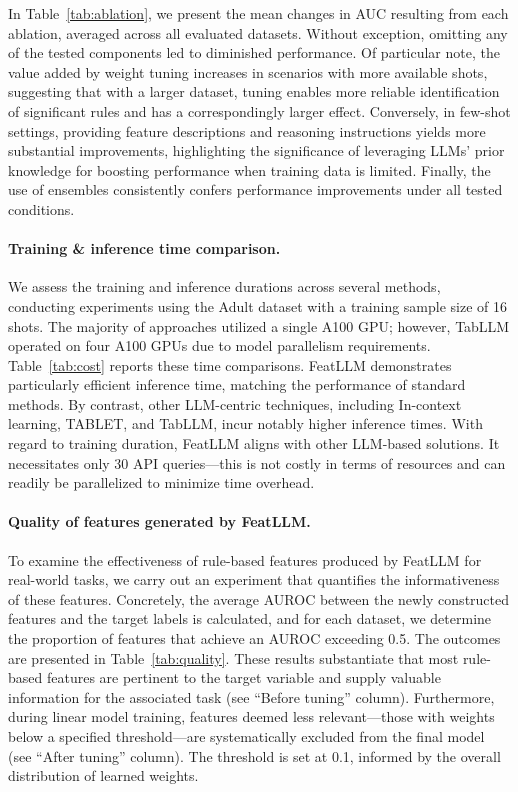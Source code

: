 In Table~\ref{tab:ablation}, we present the mean changes in AUC resulting from each ablation, averaged across all evaluated datasets. Without exception, omitting any of the tested components led to diminished performance. Of particular note, the value added by weight tuning increases in scenarios with more available shots, suggesting that with a larger dataset, tuning enables more reliable identification of significant rules and has a correspondingly larger effect. Conversely, in few-shot settings, providing feature descriptions and reasoning instructions yields more substantial improvements, highlighting the significance of leveraging LLMs' prior knowledge for boosting performance when training data is limited. Finally, the use of ensembles consistently confers performance improvements under all tested conditions.

\vspace*{-0.12in}
\paragraph{Training \& inference time comparison.} We assess the training and inference durations across several methods, conducting experiments using the Adult dataset with a training sample size of 16 shots. The majority of approaches utilized a single A100 GPU; however, TabLLM operated on four A100 GPUs due to model parallelism requirements. Table~\ref{tab:cost} reports these time comparisons. \textsf{FeatLLM} demonstrates particularly efficient inference time, matching the performance of standard methods. By contrast, other LLM-centric techniques, including In-context learning, TABLET, and TabLLM, incur notably higher inference times. With regard to training duration, \textsf{FeatLLM} aligns with other LLM-based solutions. It necessitates only 30 API queries—this is not costly in terms of resources and can readily be parallelized to minimize time overhead.

\vspace*{-0.12in}
\paragraph{Quality of features generated by \textsf{FeatLLM}.}
To examine the effectiveness of rule-based features produced by \textsf{FeatLLM} for real-world tasks, we carry out an experiment that quantifies the informativeness of these features. Concretely, the average AUROC between the newly constructed features and the target labels is calculated, and for each dataset, we determine the proportion of features that achieve an AUROC exceeding 0.5. The outcomes are presented in Table~\ref{tab:quality}. These results substantiate that most rule-based features are pertinent to the target variable and supply valuable information for the associated task (see ``Before tuning'' column). Furthermore, during linear model training, features deemed less relevant—those with weights below a specified threshold—are systematically excluded from the final model (see ``After tuning'' column). The threshold is set at 0.1, informed by the overall distribution of learned weights.


